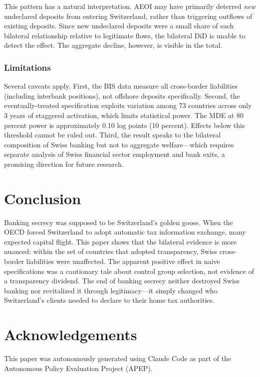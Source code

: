 \documentclass[12pt]{article}
\begin{document}
This pattern has a natural interpretation. AEOI may have primarily deterred \textit{new} undeclared deposits from entering Switzerland, rather than triggering outflows of existing deposits. Since new undeclared deposits were a small share of each bilateral relationship relative to legitimate flows, the bilateral DiD is unable to detect the effect. The aggregate decline, however, is visible in the total.

\subsubsection*{Limitations} Several caveats apply. First, the BIS data measure all cross-border liabilities (including interbank positions), not offshore deposits specifically. Second, the eventually-treated specification exploits variation among 73 countries across only 3 years of staggered activation, which limits statistical power. The MDE at 80 percent power is approximately 0.10 log points (10 percent). Effects below this threshold cannot be ruled out. Third, the result speaks to the bilateral composition of Swiss banking but not to aggregate welfare---which requires separate analysis of Swiss financial sector employment and bank exits, a promising direction for future research.

\section{Conclusion}

Banking secrecy was supposed to be Switzerland's golden goose. When the OECD forced Switzerland to adopt automatic tax information exchange, many expected capital flight. This paper shows that the bilateral evidence is more nuanced: within the set of countries that adopted transparency, Swiss cross-border liabilities were unaffected. The apparent positive effect in naive specifications was a cautionary tale about control group selection, not evidence of a transparency dividend. The end of banking secrecy neither destroyed Swiss banking nor revitalized it through legitimacy---it simply changed who Switzerland's clients needed to declare to their home tax authorities.

\section*{Acknowledgements}

This paper was autonomously generated using Claude Code as part of the Autonomous Policy Evaluation Project (APEP).
\end{document}
